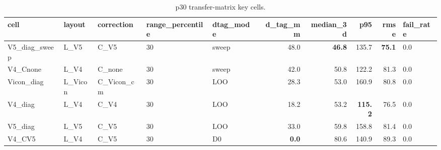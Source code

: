 \begin{table}[t]
\centering
\caption{p30 transfer-matrix key cells.}
\label{tab:transfer_matrix_diagonal}
\begin{tabular}{lllllrrrrl}
\hline
cell & layout & correction & range\_percentile & dtag\_mode & d\_tag\_mm & median\_3d & p95 & rmse & fail\_rate \\
\hline
V5\_diag\_sweep & L\_V5 & C\_V5 & 30 & sweep & 48.0 & \textbf{46.8} & 135.7 & \textbf{75.1} & 0.0 \\
V4\_Cnone & L\_V4 & C\_none & 30 & sweep & 42.0 & 50.8 & 122.2 & 81.3 & 0.0 \\
Vicon\_diag & L\_Vicon & C\_Vicon\_cm & 30 & LOO & 28.3 & 53.0 & 160.9 & 80.8 & 0.0 \\
V4\_diag & L\_V4 & C\_V4 & 30 & LOO & 18.2 & 53.2 & \textbf{115.2} & 76.5 & 0.0 \\
V5\_diag & L\_V5 & C\_V5 & 30 & LOO & 33.0 & 59.8 & 158.8 & 81.4 & 0.0 \\
V4\_CV5 & L\_V4 & C\_V5 & 30 & D0 & \textbf{0.0} & 80.6 & 140.9 & 89.3 & 0.0 \\
\hline
\end{tabular}
\end{table}
